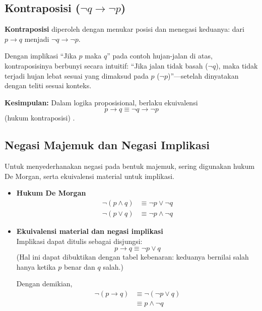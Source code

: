 \subsection{Kontraposisi ($\neg q \rightarrow \neg p$)}

\textbf{Kontraposisi} diperoleh dengan menukar posisi dan menegasi keduanya: dari $p \rightarrow q$ menjadi $\neg q \rightarrow \neg p$.

\begin{contoh}
Dengan implikasi ``Jika $p$ maka $q$'' pada contoh hujan-jalan di atas, kontraposisinya berbunyi secara intuitif: ``Jika jalan tidak basah ($\neg q$), maka tidak terjadi hujan lebat sesuai yang dimaksud pada $p$ ($\neg p$)''---setelah dinyatakan dengan teliti sesuai konteks.

\textbf{Kesimpulan:} Dalam logika proposisional, berlaku ekuivalensi
\[
p \rightarrow q \equiv \neg q \rightarrow \neg p
\]
(hukum kontraposisi) \cite{rosen2019}.
\end{contoh}

\subsection{Negasi Majemuk dan Negasi Implikasi}

Untuk menyederhanakan negasi pada bentuk majemuk, sering digunakan hukum De Morgan, serta ekuivalensi material untuk implikasi.

\begin{itemize}
    \item \textbf{Hukum De Morgan}
    \begin{align*}
        \neg(p \wedge q) &\equiv \neg p \vee \neg q \\
        \neg(p \vee q) &\equiv \neg p \wedge \neg q
    \end{align*}
    
    \item \textbf{Ekuivalensi material dan negasi implikasi}\\
    Implikasi dapat ditulis sebagai disjungsi:
    \begin{equation*}
        p \rightarrow q \equiv \neg p \vee q
    \end{equation*}
    (Hal ini dapat dibuktikan dengan tabel kebenaran: keduanya bernilai salah hanya ketika $p$ benar dan $q$ salah.)

    Dengan demikian,
    \begin{align*}
        \neg(p \rightarrow q) &\equiv \neg(\neg p \vee q) \\
                              &\equiv p \wedge \neg q
    \end{align*}
\end{itemize}
